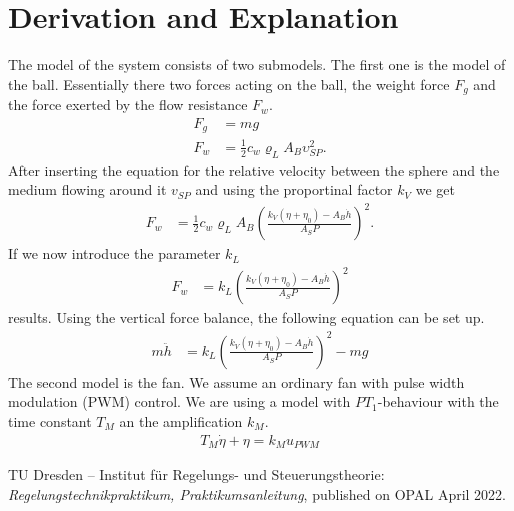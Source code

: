 \documentclass[10pt,a4paper]{article}
\begin{document}
	\section{Derivation and Explanation} %
	The model of the system consists of two submodels. The first one is the model of the ball. Essentially there two forces acting on the ball, the weight force $F_g$ and the force exerted by the flow resistance $F_w$.   
	\begin{align}
		F_g &= mg \\
		F_w &= \frac{1}{2} c_w \varrho_L A_B \upsilon_{SP}^2.
	\end{align}
	After inserting the equation for the relative velocity between the sphere and the medium flowing around it $v_{SP}$ and using the proportinal factor $k_V$ we get
	\begin{align}
		F_w &= \frac{1}{2} c_w \varrho_L A_B \left(\frac{k_V(\eta + \eta_0) - A_B \dot{h}}{A_SP}\right)^2.
	\end{align}
	If we now introduce the parameter $k_L$ 
	\begin{align}
		F_w &= k_L \left(\frac{k_V(\eta +\eta_0) - A_B\dot{h}}{A_SP}\right)^2
	\end{align} 
	results.
	Using the vertical force balance, the following equation can be set up.
	\begin{align}
		m\ddot{h}&= k_L \left(\frac{k_V(\eta +\eta_0) - A_B\dot{h}}{A_SP}\right)^2 -mg
	\end{align}
	The second model is the fan. We assume an ordinary fan with pulse width modulation (PWM) control. We are using a model with $PT_1$-behaviour with the time constant $T_M$ an the amplification $k_M$.
	\begin{align}
		T_M \dot{\eta} + \eta = k_Mu_{PWM}
	\end{align}    
	
	\begin{thebibliography}{10}		
		TU Dresden – Institut für Regelungs- und Steuerungstheorie: 
		\textit{Regelungstechnikpraktikum, Praktikumsanleitung}, published on OPAL April 2022.
	\end{thebibliography}
\end{document}
